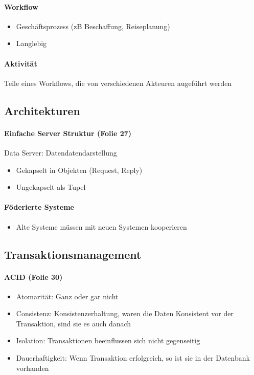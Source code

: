 \documentclass[ngerman]{scrartcl}
\begin{document}
\paragraph*{Workflow}
\begin{itemize}
  \item Geschäftsprozess (zB Beschaffung, Reiseplanung) 
  \item Langlebig
\end{itemize}
\paragraph*{Aktivität}
Teile eines Workflows, die von verschiedenen Akteuren augeführt werden

\subsection*{Architekturen}
\paragraph*{Einfache Server Struktur (Folie 27)}
Data Server: Datendatendarstellung
\begin{itemize}
  \item Gekapselt in Objekten (Request, Reply)
  \item Ungekapselt als Tupel 
\end{itemize}
\paragraph*{Föderierte Systeme}
\begin{itemize}
  \item Alte Systeme müssen mit neuen Systemen kooperieren
\end{itemize}

\subsection*{Transaktionsmanagement}
\paragraph*{ACID (Folie 30)}
\begin{itemize}
  \item Atomarität: Ganz oder gar nicht
  \item Consistenz: Konsistenzerhaltung, waren die Daten Konsistent vor der Transaktion, sind sie es auch danach
  \item Isolation: Transaktionen beeinflussen sich nicht gegenseitig
  \item Dauerhaftigkeit: Wenn Transaktion erfolgreich, so ist sie in der Datenbank vorhanden 
\end{itemize}
\end{document}
